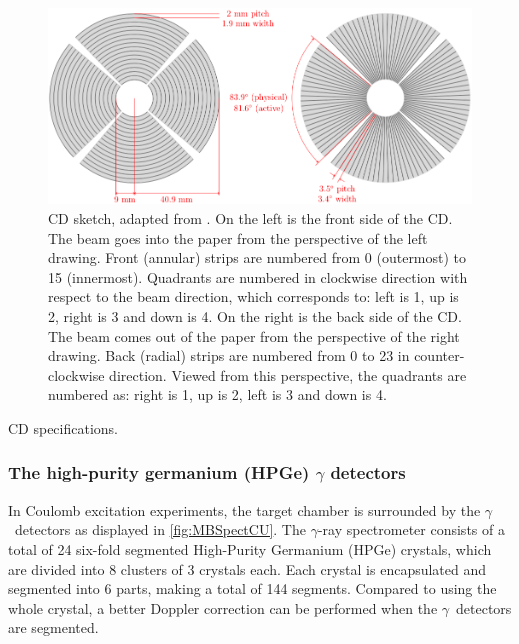 \documentclass[twoside,english]{uiofysmaster/uiofysmaster}
\newcommand{\ga}{$\gamma$}
\let\orgautoref\autoref
\renewcommand{\autoref}
        {%
		 \def\sectionautorefname{Section}%
		 \def\subsectionautorefname{Section}%
		 \def\subsubsectionautorefname{Section}%
		 \def\chapterautorefname{Chapter}%
          \orgautoref}
\begin{document}
\begin{figure}[ht]
	\centering
	\includegraphics[width=\linewidth]{Images/CD.png}
	\caption{CD sketch, adapted from \cite{NWarr-CD}. 
	On the left is the front side of the CD. 
	The beam goes into the paper from the perspective of the left drawing.
	Front (annular) strips are numbered from 0 (outermost) to 15 (innermost). 
	Quadrants are numbered in clockwise direction with respect to the beam direction, which corresponds to: left is 1, up is 2, right is 3 and down is 4.
	On the right is the back side of the CD. 
	The beam comes out of the paper from the perspective of the right drawing.
	Back (radial) strips are numbered from 0 to 23 in counter-clockwise direction.
	Viewed from this perspective, the quadrants are numbered as: right is 1, up is 2, left is 3 and down is 4.}
	\label{fig:CD-FB}
\end{figure}


\begin{table}[ht] 
    \centering 
    \caption{CD specifications.}
	
	\label{tab:CD_spec}
\end{table}


\subsubsection{The high-purity germanium (HPGe) \texorpdfstring{$\gamma$}{Gamma} detectors}
In Coulomb excitation experiments, the target chamber is surrounded by the \ga\ detectors as displayed in \autoref{fig:MBSpectCU}. 
The \ga-ray spectrometer consists of a total of 24 six-fold segmented High-Purity Germanium (HPGe) crystals, which are divided into 8 clusters of 3 crystals each. 
Each crystal is encapsulated and segmented into 6 parts, making a total of 144 segments. 
Compared to using the whole crystal, a better Doppler correction can be performed when the \ga\ detectors are segmented. 
\end{document}
